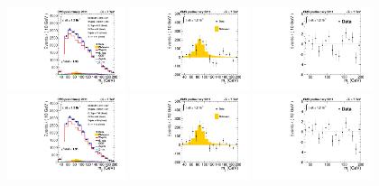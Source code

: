 \begin{figure}[h!]
{%
\linewidth
\includegraphics[width=0.31\textwidth]{figs/CDFtoWW_s2_mJJ-combined-fit.pdf} 
\linewidth
\includegraphics[width=0.31\textwidth]{figs/CDFtoWW_s2_mJJ-combined-fit-subtracted.pdf} 
\linewidth
\includegraphics[width=0.31\textwidth]{figs/CDFtoWW_s2_mJJ-combined-fit-residual.pdf} \\
\linewidth
\includegraphics[width=0.31\textwidth]{figs/CDFtoWW_s3_mJJ-combined-fit.pdf} 
\linewidth
\includegraphics[width=0.31\textwidth]{figs/CDFtoWW_s3_mJJ-combined-fit-subtracted.pdf} 
\linewidth
\includegraphics[width=0.31\textwidth]{figs/CDFtoWW_s3_mJJ-combined-fit-residual.pdf} \\
}
\end{figure}
